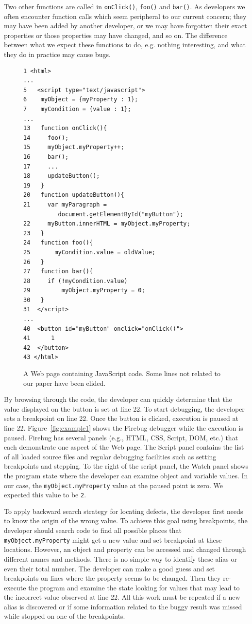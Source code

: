 \documentclass[runningheads,a4paper]{llncs}
\begin{document}
Two other functions are called in \texttt{onClick()}, \texttt{foo()}
and \texttt{bar()}. As developers we often encounter function calls
which seem peripheral to our current concern; they may have been added
by another developer, or we may have forgotten their exact properties
or those properties may have changed, and so on. The difference
between what we expect these functions to do, e.g. nothing
interesting, and what they do in practice may cause bugs.


\begin{figure}[htp]
\begin{verbatim}
1 <html>
...
5   <script type="text/javascript">
6    myObject = {myProperty : 1};
7    myCondition = {value : 1};
...
13   function onClick(){
14     foo();
15     myObject.myProperty++;
16     bar();
17     ...
18     updateButton();
19   }
20   function updateButton(){
21     var myParagraph =
          document.getElementById("myButton");
22     myButton.innerHTML = myObject.myProperty;
23   }   
24   function foo(){
25  	 myCondition.value = oldValue;
26   }  
27   function bar(){ 
28     if (!myCondition.value)
29         myObject.myProperty = 0;
30   }
31  </script> 
...
40  <button id="myButton" onclick="onClick()">
41  	1 
42  </button>
43 </html>
\end{verbatim}
\caption{A Web page containing JavaScript code. Some lines not related to our paper have been elided.}
\label{fig:js-code}
\end{figure}

By browsing through the code, the developer can quickly determine that the value displayed on the 
button is set at line 22. To start debugging, the developer sets a breakpoint
on line 22. Once the button is clicked, execution is paused at line
22. Figure~\ref{fig:example1} shows the Firebug debugger while the
execution is paused. Firebug has several panels (e.g., HTML, CSS,
Script, DOM, etc.) that each demonstrate one aspect of the Web page.
The Script panel contains the list of all loaded source
files and regular debugging facilities such as setting breakpoints and
stepping. To the right of the script panel, the Watch panel shows the program state
where the developer can examine object and variable values. In our case, the
\texttt{myObject.myProperty} value at the paused point is zero. We expected this value to be \texttt{2}.

To apply backward search strategy for locating defects, the developer
first needs to know the origin of the wrong value. To achieve this
goal using breakpoints, the developer should search code to find all possible places that
\texttt{myObject.myProperty} might get a new value and set breakpoint at these locations. However, an
object and property can be accessed and changed through different
names and methods. There is no simple way to identify these alias or
even their total number.  The developer can make a good guess and set
breakpoints on lines where the property seems to be changed. Then they
re-execute the program and examine the state looking for values that
may lead to the incorrect value observed at line 22. All this work
must be repeated if a new alias is discovered or if some
information related to the buggy result was missed while stopped on
one of the breakpoints.
\end{document}
